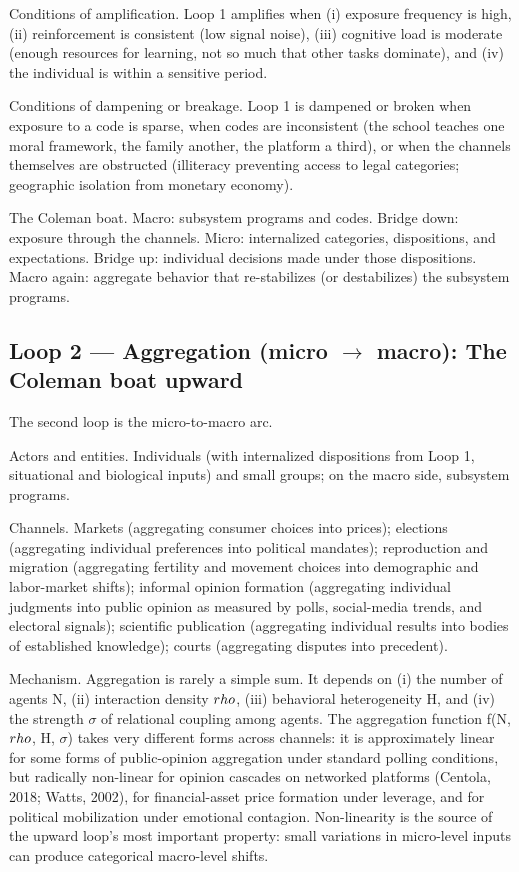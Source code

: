 \documentclass[12pt,a4paper]{article}
\begin{document}
Conditions of amplification. Loop 1 amplifies when (i) exposure frequency is high, (ii) reinforcement is consistent (low signal noise), (iii) cognitive load is moderate (enough resources for learning, not so much that other tasks dominate), and (iv) the individual is within a sensitive period.


Conditions of dampening or breakage. Loop 1 is dampened or broken when exposure to a code is sparse, when codes are inconsistent (the school teaches one moral framework, the family another, the platform a third), or when the channels themselves are obstructed (illiteracy preventing access to legal categories; geographic isolation from monetary economy).


The Coleman boat. Macro: subsystem programs and codes. Bridge down: exposure through the channels. Micro: internalized categories, dispositions, and expectations. Bridge up: individual decisions made under those dispositions. Macro again: aggregate behavior that re-stabilizes (or destabilizes) the subsystem programs.

\subsection{Loop 2 --- Aggregation (micro $\rightarrow$ macro): The Coleman boat upward}

The second loop is the micro-to-macro arc.


Actors and entities. Individuals (with internalized dispositions from Loop 1, situational and biological inputs) and small groups; on the macro side, subsystem programs.


Channels. Markets (aggregating consumer choices into prices); elections (aggregating individual preferences into political mandates); reproduction and migration (aggregating fertility and movement choices into demographic and labor-market shifts); informal opinion formation (aggregating individual judgments into public opinion as measured by polls, social-media trends, and electoral signals); scientific publication (aggregating individual results into bodies of established knowledge); courts (aggregating disputes into precedent).


Mechanism. Aggregation is rarely a simple sum. It depends on (i) the number of agents N, (ii) interaction density $\\rho$, (iii) behavioral heterogeneity H, and (iv) the strength $\sigma$ of relational coupling among agents. The aggregation function f(N, $\\rho$, H, $\sigma$) takes very different forms across channels: it is approximately linear for some forms of public-opinion aggregation under standard polling conditions, but radically non-linear for opinion cascades on networked platforms (Centola, 2018; Watts, 2002), for financial-asset price formation under leverage, and for political mobilization under emotional contagion. Non-linearity is the source of the upward loop's most important property: small variations in micro-level inputs can produce categorical macro-level shifts.
\end{document}
